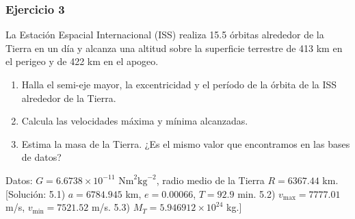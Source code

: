 	\begin{Enunciado}
		\subsubsection{Ejercicio 3}
	La Estación Espacial Internacional (ISS) realiza 15.5 órbitas alrededor de la Tierra en un día y alcanza una altitud sobre la superficie terrestre de 413 km en el perigeo y de 422 km en el apogeo.
    \begin{enumerate}[label=\alph*)]
        \item Halla el semi-eje mayor, la excentricidad y el período de la órbita de la ISS alrededor de la Tierra.
	    \item Calcula las velocidades máxima y mínima alcanzadas.
	    \item Estima la masa de la Tierra. ¿Es el mismo valor que encontramos en las bases de datos?
    \end{enumerate}
	Datos: $G = 6.6738 \times 10^{-11} \text{ Nm}^2\text{kg}^{-2}$, radio medio de la Tierra $R = 6367.44$ km. [Solución: 5.1) $a = 6784.945$ km, $e = 0.00066$, $T = 92.9$ min. 5.2) $v_{\max} = 7777.01$ m/s, $v_{\min} = 7521.52$ m/s. 5.3) $M_T = 5.946912 \times 10^{24}$ kg.]
	\end{Enunciado}

